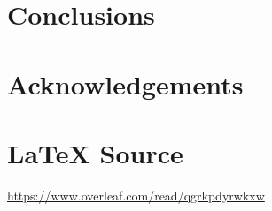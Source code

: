 \documentclass{article}
\theoremstyle{definition}
\begin{document}
%
%	
%
%
%
%
\section{Conclusions}
\label{sec:conclusions}
%
%
%
\section{Acknowledgements}
\label{sec:acknowledgements}
%
%
\section*{\LaTeX \hspace{0.025 mm} Source}
\url{https://www.overleaf.com/read/qgrkpdyrwkxw}
%
%
%


%
%
%
%
%
\end{document}
